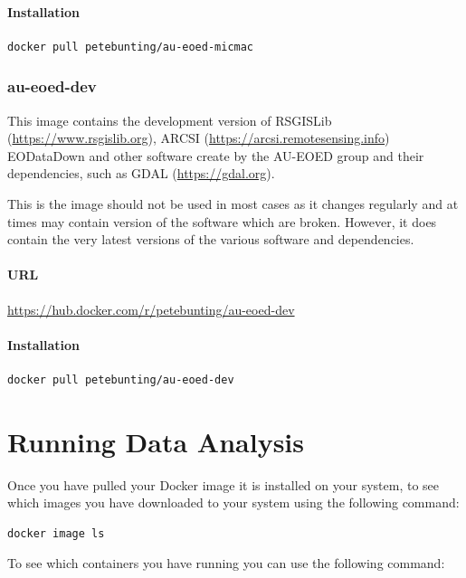\documentclass[authoryear, 11pt, oneside]{report}
\begin{document}
\subsubsection{Installation}

\begin{verbatim}
docker pull petebunting/au-eoed-micmac
\end{verbatim}


\subsection{au-eoed-dev}

This image contains the development version of RSGISLib (\url{https://www.rsgislib.org}), ARCSI (\url{https://arcsi.remotesensing.info}) EODataDown and other software create by the AU-EOED group and their dependencies, such as GDAL (\url{https://gdal.org}). 

This is the image should not be used in most cases as it changes regularly and at times may contain version of the software which are broken. However, it does contain the very latest versions of the various software and dependencies.

\subsubsection{URL}
\url{https://hub.docker.com/r/petebunting/au-eoed-dev}

\subsubsection{Installation}

\begin{verbatim}
docker pull petebunting/au-eoed-dev
\end{verbatim}


\chapter{Running Data Analysis}

Once you have pulled your Docker image it is installed on your system, to see which images you have downloaded to your system using the following command: 

\begin{verbatim}
docker image ls
\end{verbatim}

To see which containers you have running you can use the following command:
\end{document}

